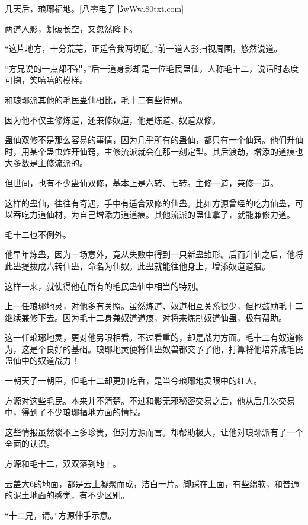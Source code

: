 
\begin{this_body}

几天后，琅琊福地。[八零电子书wWw.80txt.com]

两道人影，划破长空，又忽然降下。

“这片地方，十分荒芜，正适合我两切磋。”前一道人影扫视周围，悠然说道。

“方兄说的一点都不错。”后一道身影却是一位毛民蛊仙，人称毛十二，说话时态度可掬，笑嘻嘻的模样。

和琅琊派其他的毛民蛊仙相比，毛十二有些特别。

因为他不仅主修炼道，还兼修奴道，他是炼道、奴道双修。

蛊仙双修不是那么容易的事情，因为几乎所有的蛊仙，都只有一个仙窍。他们升仙时，用某个蛊虫炸开仙窍，主修流派就会在那一刻定型。其后渡劫，增添的道痕也大多数是主修流派的。

但世间，也有不少蛊仙双修，基本上是六转、七转。主修一道，兼修一道。

这样的蛊仙，往往有奇遇，手中有适合双修的仙蛊。比如方源曾经的吃力仙蛊，可以吞吃力道仙材，为自己增添力道道痕。其他流派的蛊仙拿了，就能兼修力道。

毛十二也不例外。

他早年炼蛊，因为一场意外，竟从失败中得到一只新蛊雏形。后而升仙之后，他将此蛊提拔成六转仙蛊，命名为仙奴。此蛊就能往他身上，增添奴道道痕。

这样一来，就使得他在所有的毛民蛊仙中相当的特别。

上一任琅琊地灵，对他多有关照。虽然炼道、奴道相互关系很少，但也鼓励毛十二继续兼修下去。因为毛十二身兼奴道道痕，对将来炼制奴道仙蛊，极有帮助。

这一任琅琊地灵，更对他另眼相看。不过看重的，却是战力方面。毛十二有奴道修为，这是个良好的基础。琅琊地灵便将仙蛊奴兽都交予了他，打算将他培养成毛民蛊仙中的奴道战力！

一朝天子一朝臣，但毛十二却更加吃香，是当今琅琊地灵眼中的红人。

方源对这些毛民。本来并不清楚。不过和影无邪秘密交易之后，他从后几次交易中，得到了不少琅琊福地方面的情报。

这些情报虽然谈不上多珍贵，但对方源而言。却帮助极大，让他对琅琊派有了一个全面的认识。

方源和毛十二，双双落到地上。

云盖大6的地面，都是云土凝聚而成，洁白一片。脚踩在上面，有些绵软，和普通的泥土地面的感觉，有不少区别。

“十二兄，请。”方源伸手示意。


\end{this_body}
